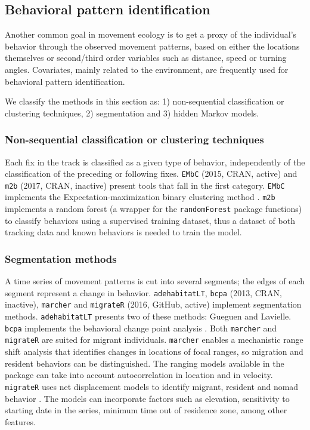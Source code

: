 \documentclass[a4paper,12pt]{article}
\newcommand{\Rpkg}[1]{\texttt{#1}}
\begin{document}
\subsection*{Behavioral pattern identification}

Another common goal in movement ecology is to get a proxy of the individual's behavior through the observed movement patterns, based on either the locations themselves or second/third order variables such as distance, speed or turning angles. Covariates, mainly related to the environment, are frequently used for behavioral pattern identification. 

We classify the methods in this section as: 1) non-sequential classification or clustering techniques, 2) segmentation and 3) hidden Markov models.

\subsubsection*{Non-sequential classification or clustering techniques}

Each fix in the track is classified as a given type of behavior, independently of the classification of the preceding or following fixes. \Rpkg{EMbC} (2015, CRAN, active) and \Rpkg{m2b} (2017, CRAN, inactive) present tools that fall in the first category. \Rpkg{EMbC} implements the Expectation-maximization binary clustering method \citep{Garriga2016}. \Rpkg{m2b} implements a random forest (a wrapper for the \Rpkg{randomForest} package functions) to classify behaviors using a supervised training dataset, thus a dataset of both tracking data and known behaviors is needed to train the model.

\subsubsection*{Segmentation methods}

A time series of movement patterns is cut into several segments; the edges of each segment represent a change in behavior. \Rpkg{adehabitatLT}, \Rpkg{bcpa} (2013, CRAN, inactive), \Rpkg{marcher} and \Rpkg{migrateR} (2016, GitHub, active) implement segmentation methods. \Rpkg{adehabitatLT} presents two of these methods: Gueguen and Lavielle. \Rpkg{bcpa} implements the behavioral change point analysis \citep{Gurarie2009}. Both \Rpkg{marcher} and \Rpkg{migrateR} are suited for migrant individuals. \Rpkg{marcher} enables a mechanistic range shift analysis \citep{Gurarie2017} that identifies changes in locations of focal ranges, so migration and resident behaviors can be distinguished. The ranging models available in the package can take into account autocorrelation in location and in velocity. \Rpkg{migrateR} uses net displacement models to identify migrant, resident and nomad behavior \citep{Spitz2017}. The models can incorporate factors such as elevation, sensitivity to starting date in the series, minimum time out of residence zone, among other features.  
\end{document}
